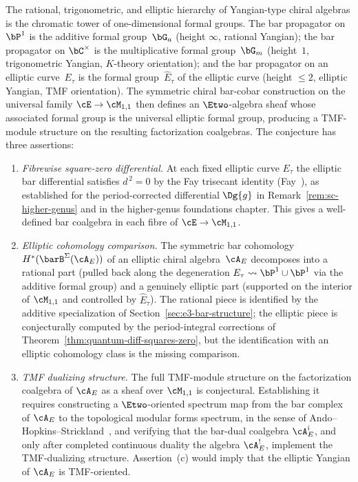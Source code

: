\begin{conjecture}
\label{conj:chromatic-bar-cobar}
The rational, trigonometric, and elliptic hierarchy of Yangian-type
chiral algebras is the chromatic tower of one-dimensional formal
groups. The bar propagator on $\bP^1$ is the additive formal
group~$\bG_a$ \textup{(}height $\infty$, rational Yangian\textup{)};
the bar propagator on $\bC^\times$ is the multiplicative formal
group~$\bG_m$ \textup{(}height~$1$, trigonometric Yangian, $K$-theory
orientation\textup{)}; and the bar propagator on an elliptic
curve~$E_\tau$ is the formal group~$\hat E_\tau$ of the elliptic
curve \textup{(}height $\leq 2$, elliptic Yangian, TMF
orientation\textup{)}. The symmetric chiral bar-cobar construction on
the universal family
$\cE \to \cM_{1,1}$ then defines an $\Etwo$-algebra sheaf whose
associated formal group is the universal elliptic formal group,
producing a TMF-module structure on the resulting factorization
coalgebras. The conjecture has three assertions:
\begin{enumerate}[label=\textup{(\alph*)}]
\item \emph{Fibrewise square-zero differential.}
 At each fixed elliptic curve $E_\tau$
 the elliptic bar differential satisfies $d^{\,2} = 0$ by the Fay
 trisecant identity \textup{(}Fay~\cite{Fay73}\textup{)}, as
 established for the period-corrected differential $\Dg{g}$
 in Remark~\ref{rem:sc-higher-genus} and in the higher-genus
 foundations chapter. This gives a well-defined bar coalgebra
 in each fibre of $\cE \to \cM_{1,1}$.
\item \emph{Elliptic cohomology comparison.}
 The symmetric bar cohomology
 $H^*(\barB^{\Sigma}(\cA_E))$ of an elliptic chiral algebra~$\cA_E$
 decomposes into a rational part
 \textup{(}pulled back along the degeneration $E_\tau \leadsto
 \bP^1 \cup \bP^1$ via the additive formal group\textup{)} and a
 genuinely elliptic part \textup{(}supported on the interior of
 $\cM_{1,1}$ and controlled by $\hat E_\tau$\textup{)}. The
 rational piece is identified by the additive specialization of
 Section~\ref{sec:e3-bar-structure}; the elliptic
 piece is conjecturally computed by the period-integral
 corrections of Theorem~\ref{thm:quantum-diff-squares-zero}, but
 the identification with an elliptic cohomology class is the missing
 comparison.
\item \emph{TMF dualizing structure.}
 The full TMF-module structure on the
 factorization coalgebra of $\cA_E$ as a sheaf over $\cM_{1,1}$ is
 conjectural. Establishing it requires constructing a
 $\Etwo$-oriented spectrum map from the bar complex of $\cA_E$ to
 the topological modular forms spectrum, in the sense of
 Ando--Hopkins--Strickland~\cite{AHS01}, and verifying that the
 bar-dual coalgebra $\cA_E^{\mathrm i}$, and only after completed
 continuous duality the algebra $\cA_E^!$, implement the
 TMF-dualizing structure. Assertion~\textup{(c)} would imply that
 the elliptic Yangian of $\cA_E$ is TMF-oriented.
\end{enumerate}
\end{conjecture}

